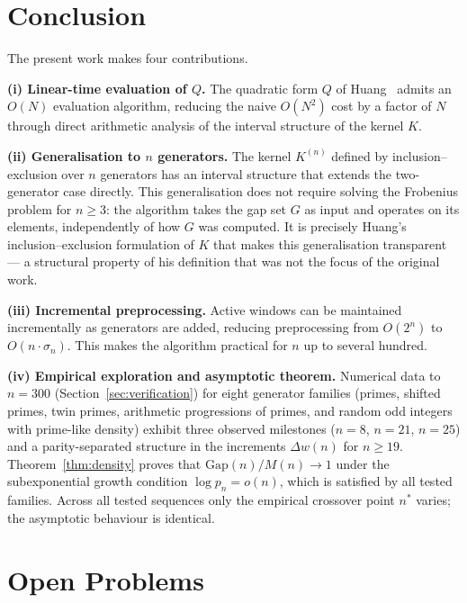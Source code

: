 \documentclass[11pt,a4paper]{amsart}
\theoremstyle{plain}
\theoremstyle{definition}
\theoremstyle{remark}
\begin{document}
\section{Conclusion}
\label{sec:conclusion}

The present work makes four contributions.

\textbf{(i) Linear-time evaluation of $Q$.}
The quadratic form $Q$ of Huang~\cite{Huang2026} admits an $O(N)$
evaluation algorithm, reducing the naive $O(N^2)$ cost by a factor
of $N$ through direct arithmetic analysis of the interval structure
of the kernel $K$.

\textbf{(ii) Generalisation to $n$ generators.}
The kernel $K^{(n)}$ defined by inclusion--exclusion over $n$ generators
has an interval structure that extends the two-generator case directly.
This generalisation does not require solving the Frobenius problem for
$n \geq 3$: the algorithm takes the gap set $G$ as input and operates
on its elements, independently of how $G$ was computed.
It is precisely Huang's inclusion--exclusion formulation of $K$ that
makes this generalisation transparent --- a structural property of his
definition that was not the focus of the original work.

\textbf{(iii) Incremental preprocessing.}
Active windows can be maintained incrementally as generators are added,
reducing preprocessing from $O(2^n)$ to $O(n \cdot \sigma_n)$.
This makes the algorithm practical for $n$ up to several hundred.

\textbf{(iv) Empirical exploration and asymptotic theorem.}
Numerical data to $n = 300$ (Section~\ref{sec:verification}) for
eight generator families (primes, shifted primes, twin primes,
arithmetic progressions of primes, and random odd integers with
prime-like density) exhibit three observed milestones ($n=8$,
$n=21$, $n=25$) and a parity-separated structure in the increments
$\Delta w(n)$ for $n \geq 19$. Theorem~\ref{thm:density} proves that
$\mathrm{Gap}(n)/M(n) \to 1$ under the subexponential growth condition
$\log p_n = o(n)$, which is satisfied by all tested families. Across
all tested sequences only the empirical crossover point $n^*$ varies;
the asymptotic behaviour is identical.

\section{Open Problems}
\label{sec:open}
\end{document}
